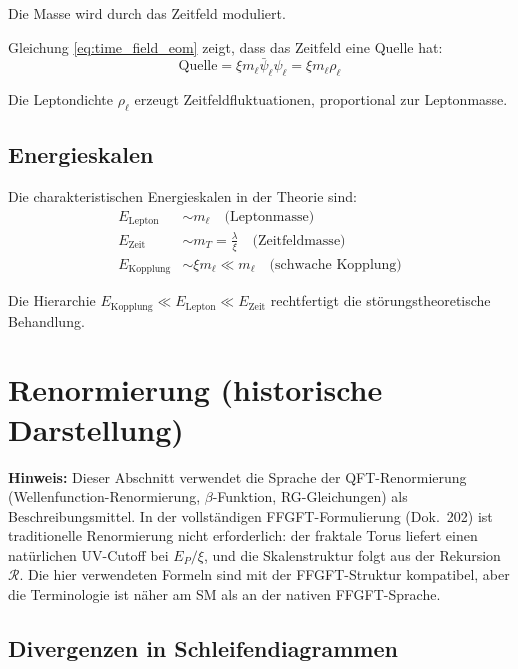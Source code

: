 	Die Masse wird durch das Zeitfeld moduliert.
	
	Gleichung \eqref{eq:time_field_eom} zeigt, dass das Zeitfeld eine Quelle hat:
	\begin{equation}
		\text{Quelle} = \xi m_\ell \bar{\psi}_\ell \psi_\ell = \xi m_\ell \rho_\ell
		\label{eq:source_term}
	\end{equation}
	
	Die Leptondichte $\rho_\ell$ erzeugt Zeitfeldfluktuationen, proportional zur Leptonmasse.
	
	\subsection{Energieskalen}
	
	Die charakteristischen Energieskalen in der Theorie sind:
	\begin{align}
		E_{\text{Lepton}} &\sim m_\ell \quad \text{(Leptonmasse)} \label{eq:lepton_scale} \\
		E_{\text{Zeit}} &\sim m_T = \frac{\lambda}{\xi} \quad \text{(Zeitfeldmasse)} \label{eq:time_scale} \\
		E_{\text{Kopplung}} &\sim \xi m_\ell \ll m_\ell \quad \text{(schwache Kopplung)} \label{eq:coupling_scale}
	\end{align}
	
	Die Hierarchie $E_{\text{Kopplung}} \ll E_{\text{Lepton}} \ll E_{\text{Zeit}}$ rechtfertigt die störungstheoretische Behandlung.
	
	\section{Renormierung (historische Darstellung)}

\textbf{Hinweis:} Dieser Abschnitt verwendet die Sprache der QFT-Renormierung (Wellenfunction-Renormierung, $\beta$-Funktion, RG-Gleichungen) als Beschreibungsmittel. In der vollständigen FFGFT-Formulierung (Dok.~202) ist traditionelle Renormierung nicht erforderlich: der fraktale Torus liefert einen natürlichen UV-Cutoff bei $E_P/\xi$, und die Skalenstruktur folgt aus der Rekursion $\mathcal{R}$. Die hier verwendeten Formeln sind mit der FFGFT-Struktur kompatibel, aber die Terminologie ist näher am SM als an der nativen FFGFT-Sprache.
	
	\subsection{Divergenzen in Schleifendiagrammen}
	
